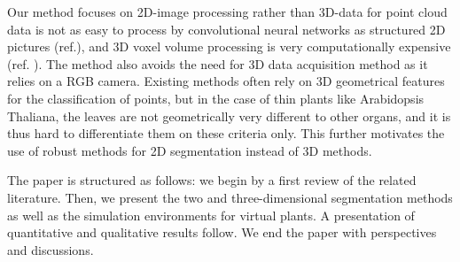 Our method focuses on 2D-image processing rather than 3D-data for point cloud data is not as
easy to process by convolutional neural networks as structured 2D pictures
(ref.), and 3D voxel volume processing is very computationally expensive (ref. ).
The method also avoids the need for 3D data acquisition method as it relies on a RGB camera.
Existing methods often rely on 3D geometrical features for the classification of points, but in the
case of thin plants like Arabidopsis Thaliana, the leaves are not
geometrically very different to other organs, and it is thus hard to differentiate them on these
criteria only. This further motivates the use of robust methods for 2D
segmentation instead of 3D methods.

The paper is structured as follows: we begin by a first review of the related
literature. Then, we present the two and three-dimensional segmentation methods
as well as the simulation environments for virtual plants. A presentation of
quantitative and qualitative results follow. We end the paper with perspectives
and discussions.
